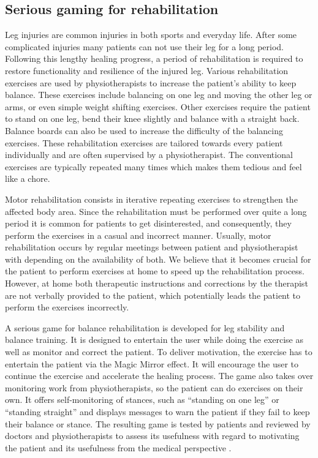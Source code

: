 \subsection{Serious gaming for rehabilitation} \label{sec:3-IMR:gaming}
Leg injuries are common injuries in both sports and everyday life. After some complicated injuries many patients can not use their leg for a long period. Following this lengthy healing progress, a period of rehabilitation is required to restore functionality and resilience of the injured leg. Various rehabilitation exercises are used by physiotherapists to increase the patient's ability to keep balance. 
These exercises include balancing on one leg and moving the other leg or arms, or even simple weight shifting exercises. Other exercises require the patient to stand on one leg, bend their knee slightly and balance with a straight back. Balance boards can also be used to increase the difficulty of the balancing exercises. These rehabilitation exercises are tailored towards every patient individually and are often supervised by a physiotherapist. The conventional exercises are typically repeated many times which makes them tedious and feel like a chore.

Motor rehabilitation consists in iterative repeating exercises to strengthen the affected body area. Since the rehabilitation must be performed over quite a long period it is common for patients to get disinterested, and consequently, they perform the exercises in a casual and incorrect manner. 
Usually, motor rehabilitation occurs by regular meetings between patient and physiotherapist with  depending on the availability of both. We believe that it becomes crucial for the patient to perform exercises at home to speed up the rehabilitation process. However, at home both therapeutic instructions and corrections by the therapist are not verbally provided to the patient, which potentially leads the patient to perform the exercises incorrectly.

A serious game for balance rehabilitation is developed for leg stability and balance training. It is designed to entertain the user while doing the exercise as well as monitor and correct the patient. To deliver motivation, the exercise has to entertain the patient via the Magic Mirror effect. It will encourage the user to continue the exercise and accelerate the healing process. The game also takes over monitoring work from physiotherapists, so the patient can do exercises on their own. It offers self-monitoring of stances, such as ``standing on one leg'' or ``standing straight'' and displays messages to warn the patient if they fail to keep their balance or stance.
The resulting game is tested by patients and reviewed by doctors and physiotherapists to assess its usefulness with regard to motivating the patient and its usefulness from the medical perspective \cite{Reichhold2014}.

